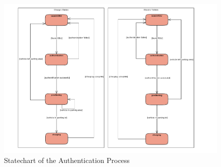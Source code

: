 \begin{figure}[htb]
	\centering
	\includegraphics[width=1\textwidth]{images/activity}
	\caption{Statechart of the Authentication Process}
	\label{fig:activity}
\end{figure}

\clearpage
\pagebreak



